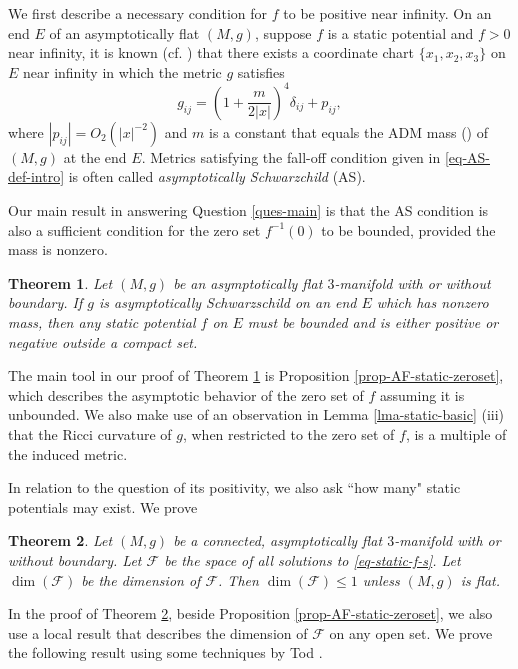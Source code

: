 \documentclass[12pt]{amsart}
\newtheorem{thm}{Theorem}[section]
\theoremstyle{remark}
\numberwithin{equation}{section}
\newcommand{\be}{\begin{equation}}
\newcommand{\ee}{\end{equation}}
\def\lf{\left}
\def\ri{\right}
\def\K{\mathcal{F}}
\begin{document}
We first describe a necessary condition for  $f$ to be positive near infinity.
On an end $E$ of an asymptotically flat  $(M, g)$,
suppose $f$ is a static potential  and $f>0$ near infinity, 
it is  known (cf. \cite{Beig-1980, Bunting-Masood}) that
there exists a  coordinate chart
$ \{ x_1, x_2, x_3 \}$  on $E$ near infinity   in which
the metric $g$ satisfies
\be \label{eq-AS-def-intro}
g_{ij} = \lf( 1 + \frac{m}{2 | x|} \ri)^4 \delta_{ij}+ p_{ij},
\ee
where  $ |p_{ij}|=O_2(|x|^{-2})$ and   $m$ is a constant that equals
the  ADM mass  (\cite{ADM61})  of $(M, g)$ at the end $E$.
Metrics satisfying the  fall-off  condition given in  \eqref{eq-AS-def-intro}
is often called  {\em asymptotically Schwarzchild} (AS).

Our main result in answering  Question \ref{ques-main} is that the AS
condition is also  a sufficient condition for the zero set $f^{-1}(0)$ to be  bounded, provided the mass is nonzero.

\begin{thm} \label{thm-main-AS}
Let $(M, g)$ be an asymptotically flat $3$-manifold with or without boundary.
If $g$ is asymptotically Schwarzschild on an end $E$ which has nonzero  mass,
then any static potential  $f$ on $E$  must be bounded  and is   either   positive or  negative
 outside a compact set.
\end{thm}


The  main tool in our proof of  Theorem \ref{thm-main-AS}  is Proposition \ref{prop-AF-static-zeroset}, which describes
 the asymptotic behavior of the zero set of $f$ assuming it is  unbounded. We also make use of an observation
 in Lemma \ref{lma-static-basic} (iii)
that  the Ricci curvature of $g$, when restricted to the zero set of $f$, is  a multiple of the induced metric.


In relation to the question of its positivity,  we also ask ``how many" static potentials may   exist.
We prove

\begin{thm} \label{thm-main-dimension}
Let $(M, g)$ be a connected,  asymptotically flat $3$-manifold with or without boundary.
Let $\K$ be the space of all solutions to \eqref{eq-static-f-s}.
Let  $\dim (\K) $ be  the dimension of $\K$.
Then
 $ \dim (\K) \le 1 $ unless $(M, g)$ is flat.
\end{thm}

In the proof of Theorem \ref{thm-main-dimension}, beside  Proposition \ref{prop-AF-static-zeroset},
we also use  a local result that describes the dimension of $\K$ on any open set. 
We prove the following result using some techniques by Tod \cite{Tod-2000}. 
\end{document}
